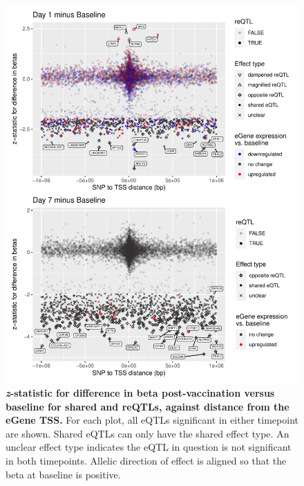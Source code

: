 \begin{figure}
    \centering
    \includegraphics[width=1.0\textwidth]{mainmatter/figures/chapter_03/compare_dge_eqtl.z_sharing.vs.SNP_gene_TSS_dist.pdf}
    \caption[
    ]{
        \textbf{\textit{z}-statistic for difference in beta post-vaccination versus baseline for shared and \glspl{reQTL}, against distance from the eGene \gls{TSS}.}
        For each plot, all \glspl{eQTL} significant in either timepoint are shown.
        Shared \glspl{eQTL} can only have the shared effect type.
        An unclear effect type indicates the \gls{eQTL} in question is not significant in both timepoints.
        Allelic direction of effect is aligned so that the beta at baseline is positive. 
    }
    \label{fig:hird_reQTL_zSharing_vs_TSSdist_mega}
\end{figure}


